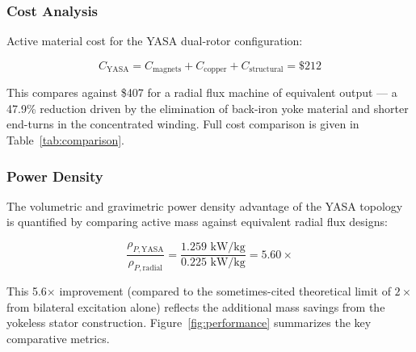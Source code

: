 \documentclass[12pt,a4paper]{article}
\begin{document}
\subsubsection{Cost Analysis}
Active material cost for the YASA dual-rotor configuration:

\begin{equation}
C_{\text{YASA}} = C_{\text{magnets}} + C_{\text{copper}} + C_{\text{structural}} = \$212
\end{equation}

This compares against \$407 for a radial flux machine of equivalent output — a 47.9\% reduction driven by the elimination of back-iron yoke material and shorter end-turns in the concentrated winding. Full cost comparison is given in Table~\ref{tab:comparison}.

\subsubsection{Power Density}
The volumetric and gravimetric power density advantage of the YASA topology is quantified by comparing active mass against equivalent radial flux designs:

\begin{equation}
\frac{\rho_{P,\text{YASA}}}{\rho_{P,\text{radial}}} = \frac{1.259 \text{ kW/kg}}{0.225 \text{ kW/kg}} = 5.60\times
\end{equation}

This 5.6$\times$ improvement (compared to the sometimes-cited theoretical limit of $2\times$ from bilateral excitation alone) reflects the additional mass savings from the yokeless stator construction. Figure~\ref{fig:performance} summarizes the key comparative metrics.
\end{document}

